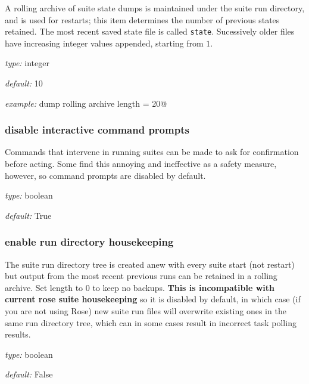 A rolling archive of suite state dumps is maintained under the suite run
directory, and is used for restarts; this item determines the number of
previous states retained. The most recent saved state file is called
\lstinline=state=. Sucessively older files have increasing integer
values appended, starting from $1$.

\begin{myitemize}
\item {\em type:} integer
\item {\em default:} 10
\item {\em example:} \lstinline@state dump rolling archive length = 20@
\end{myitemize}

\subsubsection{disable interactive command prompts}

Commands that intervene in running suites can be made to ask for
confirmation before acting. Some find this annoying and ineffective as a
safety measure, however, so command prompts are disabled by default.

\begin{myitemize}
\item {\em type:} boolean
\item {\em default:} True
\end{myitemize}

\subsubsection{enable run directory housekeeping}

The suite run directory tree is created anew with every suite start
(not restart) but output from the most recent previous runs can be 
retained in a rolling archive. Set length to 0 to keep no backups.
{\bf This is incompatible with current rose suite housekeeping} so it is
disabled by default, in which case (if you are not using Rose) new suite
run files will overwrite existing ones in the same run directory tree,
which can in some cases result in incorrect task polling results.

\begin{myitemize}
\item {\em type:} boolean
\item {\em default:} False
\end{myitemize}

